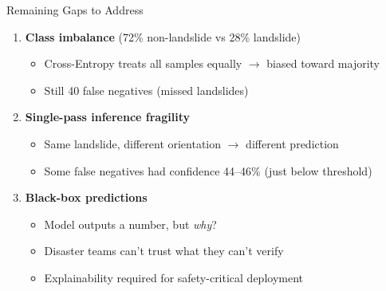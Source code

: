\documentclass[aspectratio=169]{beamer}
\begin{document}
\begin{frame}{Remaining Gaps to Address}
    \begin{enumerate}
        \item \textbf{Class imbalance} (72\% non-landslide vs 28\% landslide)
            \begin{itemize}
                \item Cross-Entropy treats all samples equally $\to$ biased toward majority
                \item Still 40 false negatives (missed landslides)
            \end{itemize}

        \item \textbf{Single-pass inference fragility}
            \begin{itemize}
                \item Same landslide, different orientation $\to$ different prediction
                \item Some false negatives had confidence 44--46\% (just below threshold)
            \end{itemize}

        \item \textbf{Black-box predictions}
            \begin{itemize}
                \item Model outputs a number, but \textit{why}?
                \item Disaster teams can't trust what they can't verify
                \item Explainability required for safety-critical deployment
            \end{itemize}
    \end{enumerate}
\end{frame}
\end{document}
